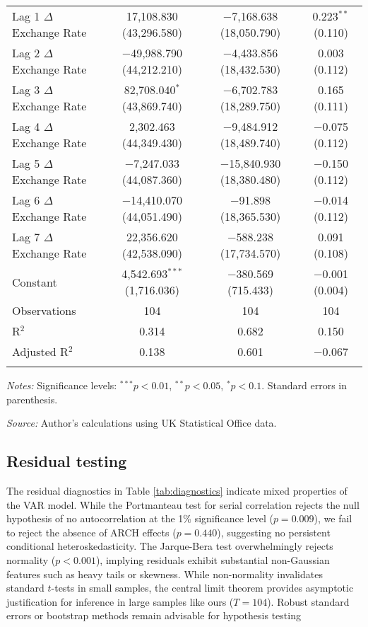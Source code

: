 \documentclass[
]{article}
\let\oldtable\table
\let\endoldtable\endtable
\renewenvironment{table}[1][H]{\oldtable[H]}{\endoldtable}
\begin{document}
\begin{table}[!htbp]
\begin{tabular}{@{\extracolsep{5pt}}lccc}
  Lag 1 $\Delta$Exchange Rate & 17,108.830 (43,296.580) & $-$7,168.638 (18,050.790) & 0.223$^{**}$ (0.110) \\[1.2ex]  
  Lag 2 $\Delta$Exchange Rate & $-$49,988.790 (44,212.210) & $-$4,433.856 (18,432.530) & 0.003 (0.112) \\[1.2ex]  
  Lag 3 $\Delta$Exchange Rate & 82,708.040$^{*}$ (43,869.740) & $-$6,702.783 (18,289.750) & 0.165 (0.111) \\[1.2ex]  
  Lag 4 $\Delta$Exchange Rate & 2,302.463 (44,349.430) & $-$9,484.912 (18,489.740) & $-$0.075 (0.112) \\[1.2ex]  
  Lag 5 $\Delta$Exchange Rate & $-$7,247.033 (44,087.360) & $-$15,840.930 (18,380.480) & $-$0.150 (0.112) \\[1.2ex]  
  Lag 6 $\Delta$Exchange Rate & $-$14,410.070 (44,051.490) & $-$91.898 (18,365.530) & $-$0.014 (0.112) \\[1.2ex]  
  Lag 7 $\Delta$Exchange Rate & 22,356.620 (42,538.090) & $-$588.238 (17,734.570) & 0.091 (0.108) \\[1.2ex]  
  Constant & 4,542.693$^{***}$ (1,716.036) & $-$380.569 (715.433) & $-$0.001 (0.004) \\[1.4ex]  
 Observations & 104 & 104 & 104 \\ 
R$^{2}$ & 0.314 & 0.682 & 0.150 \\ 
Adjusted R$^{2}$ & 0.138 & 0.601 & $-$0.067 \\ 
\hline \\[-1.8ex] 
\end{tabular} 
\begin{minipage}{\textwidth}
\footnotesize
\textit{Notes:} Significance levels: $^{***}p<0.01$, $^{**}p<0.05$, $^{*}p<0.1$. Standard errors in parenthesis.

\textit{Source:} Author's calculations using UK Statistical Office data.
\end{minipage}
\end{table} 

\subsection{Residual testing}

The residual diagnostics in Table \ref{tab:diagnostics} indicate mixed 
properties of the VAR model. While the Portmanteau test for serial 
correlation rejects the null hypothesis of no autocorrelation at the 1\% 
significance level ($p = 0.009$), we fail to reject the absence of ARCH 
effects ($p = 0.440$), suggesting no persistent conditional heteroskedasticity.
The Jarque-Bera test overwhelmingly rejects normality ($p < 0.001$), implying 
residuals exhibit substantial non-Gaussian features such as heavy tails or skewness. 
While non-normality invalidates standard $t$-tests in small samples, the central 
limit theorem provides asymptotic justification for inference in large samples
like ours ($T = 104$). Robust standard errors or bootstrap methods remain advisable
for hypothesis testing
\end{document}
